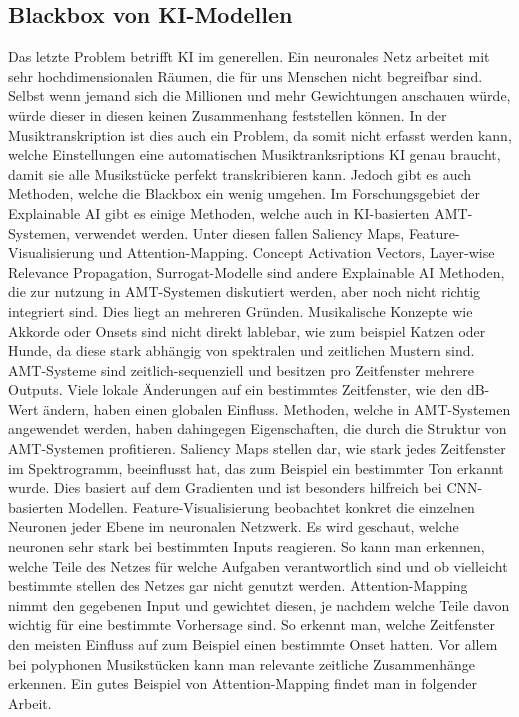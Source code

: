 \subsection{Blackbox von KI-Modellen}
Das letzte Problem betrifft KI im generellen.
Ein neuronales Netz arbeitet mit sehr hochdimensionalen Räumen, die für uns Menschen nicht begreifbar sind.
Selbst wenn jemand sich die Millionen und mehr Gewichtungen anschauen würde,
würde dieser in diesen keinen Zusammenhang feststellen können.
In der Musiktranskription ist dies auch ein Problem, da somit nicht erfasst werden kann,
welche Einstellungen eine automatischen Musiktranksriptions KI genau braucht,
damit sie alle Musikstücke perfekt transkribieren kann.
Jedoch gibt es auch Methoden, welche die Blackbox ein wenig umgehen.
Im Forschungsgebiet der Explainable AI gibt es einige Methoden,
welche auch in KI-basierten AMT-Systemen, verwendet werden.
Unter diesen fallen Saliency Maps, Feature-Visualisierung und Attention-Mapping.
Concept Activation Vectors, Layer-wise Relevance Propagation, Surrogat-Modelle sind andere Explainable AI Methoden,
die zur nutzung in AMT-Systemen diskutiert werden, aber noch nicht richtig integriert sind.
Dies liegt an mehreren Gründen.
Musikalische Konzepte wie Akkorde oder Onsets sind nicht direkt lablebar, wie zum beispiel Katzen oder Hunde,
da diese stark abhängig von spektralen und zeitlichen Mustern sind.
AMT-Systeme sind zeitlich-sequenziell und besitzen pro Zeitfenster mehrere Outputs.
Viele lokale Änderungen auf ein bestimmtes Zeitfenster, wie den dB-Wert ändern, haben einen globalen Einfluss.
Methoden, welche in AMT-Systemen angewendet werden,
haben dahingegen Eigenschaften, die durch die Struktur von AMT-Systemen profitieren.
Saliency Maps stellen dar, wie stark jedes Zeitfenster im Spektrogramm,
beeinflusst hat, das zum Beispiel ein bestimmter Ton erkannt wurde.
Dies basiert auf dem Gradienten und ist besonders hilfreich bei CNN-basierten Modellen.
Feature-Visualisierung beobachtet konkret die einzelnen Neuronen jeder Ebene im neuronalen Netzwerk.
Es wird geschaut, welche neuronen sehr stark bei bestimmten Inputs reagieren.
So kann man erkennen, welche Teile des Netzes für welche Aufgaben verantwortlich sind
und ob vielleicht bestimmte stellen des Netzes gar nicht genutzt werden.
Attention-Mapping nimmt den gegebenen Input und gewichtet diesen,
je nachdem welche Teile davon wichtig für eine bestimmte Vorhersage sind.
So erkennt man, welche Zeitfenster den meisten Einfluss auf zum Beispiel einen bestimmte Onset hatten.
Vor allem bei polyphonen Musikstücken kann man relevante zeitliche Zusammenhänge erkennen.
Ein gutes Beispiel von Attention-Mapping findet man in folgender Arbeit.
\cite{cheuk2021revisiting}
